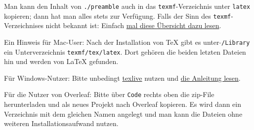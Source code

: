 Man kann den Inhalt von \texttt{./preamble} auch in das  \texttt{texmf}-Verzeichnis unter \texttt{latex} kopieren; dann hat man alles stets zur Verfügung.
Falls der Sinn des \texttt{texmf}-Verzeichnises nicht bekannt ist: Einfach \href{https://www.overleaf.com/learn/latex/Articles/An_introduction_to_Kpathsea_and_how_TeX_engines_search_for_files
\%23Table_listing_Kpathsea_.E2.80.9Cconfig_variables.E2.80.9D}{mal diese Übersicht dazu lesen}.
\begin{remark}
Ein Hinweis für Mac-User: Nach der Installation von \TeX{} gibt es unter \texttt{$\tilde{}$/Library} ein Unterverzeichnis \texttt{texmf/tex/latex}.
Dort gehören die beiden letzten Dateien hin und werden von \LaTeX{} gefunden.

Für Windows-Nutzer: Bitte unbedingt \href{http://texlive.tug.org/texlive/}{texlive} nutzen und \href{http://texlive.tug.org/texlive/windows.html}{die Anleitung lesen}.
\end{remark}
%
\begin{remark}
Für die Nutzer von Overleaf: Bitte über \texttt{Code} rechts oben die zip-File herunterladen und als neues Projekt nach Overleaf kopieren. 
Es wird dann ein Verzeichnis mit dem gleichen Namen angelegt und man kann die Dateien ohne weiteren Installationsaufwand nutzen.
\end{remark}
